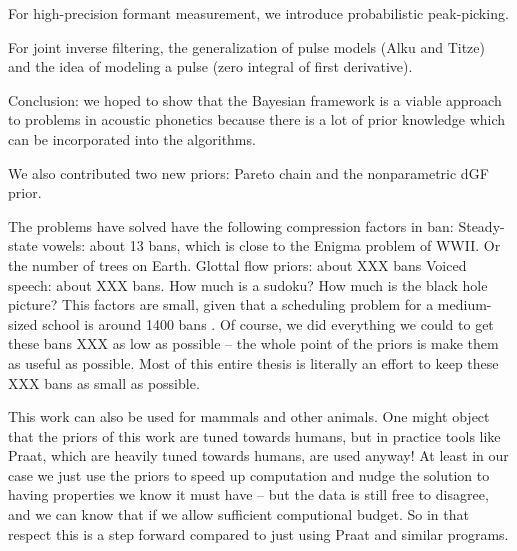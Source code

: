 For high-precision formant measurement, we introduce probabilistic peak-picking.

For joint inverse filtering, the generalization of pulse models (Alku and Titze) and the idea of modeling a pulse (zero integral of first derivative).

Conclusion: we hoped to show that the Bayesian framework is a viable approach to problems in acoustic phonetics because there is a lot of prior knowledge which can be incorporated into the algorithms.

We also contributed two new priors: Pareto chain and the nonparametric dGF prior.

The problems have solved have the following compression factors in ban:
Steady-state vowels: about 13 bans, which is close to the Enigma problem of WWII. Or the number of trees on Earth.
Glottal flow priors: about XXX bans
Voiced speech: about XXX bans. How much is a sudoku? How much is the black hole picture?
This factors are small, given that a scheduling problem for a medium-sized school is around 1400 bans \citep{Bontekoe2006}.
Of course, we did everything we could to get these bans XXX as low as possible -- the whole point of the priors is make them as useful as possible.
Most of this entire thesis is literally an effort to keep these XXX bans as small as possible.

This work can also be used for mammals and other animals.
One might object that the priors of this work are tuned towards humans, but in practice tools like Praat, which are heavily tuned towards humans, are used anyway!
At least in our case we just use the priors to speed up computation and nudge the solution to having properties we know it must have -- but the data is still free to disagree, and we can know that if we allow sufficient computional budget.
So in that respect this is a step forward compared to just using Praat and similar programs.

